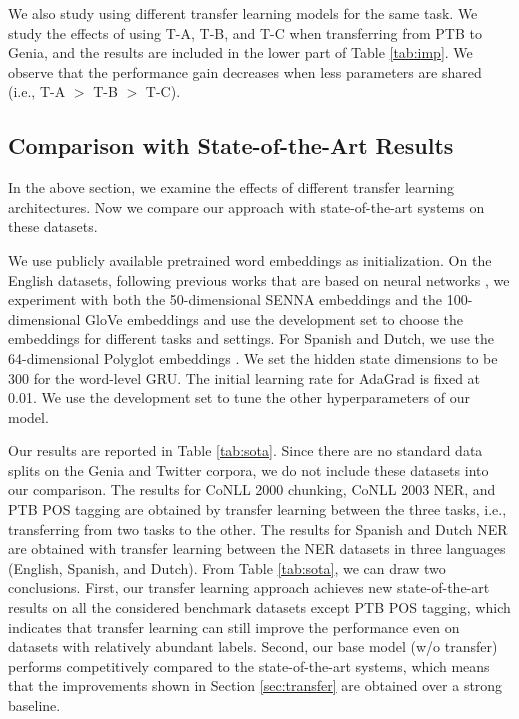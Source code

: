We also study using different transfer learning models for the same task. We study the effects of using T-A, T-B, and T-C when transferring from PTB to Genia, and the results are included in the lower part of Table \ref{tab:imp}. We observe that the performance gain decreases when less parameters are shared (i.e., T-A $>$ T-B $>$ T-C).

\subsection{Comparison with State-of-the-Art Results}

In the above section, we examine the effects of different transfer learning architectures. Now we compare our approach with state-of-the-art systems on these datasets.

We use publicly available pretrained word embeddings as initialization. On the English datasets, following previous works that are based on neural networks \citep{collobert2011natural,huang2015bidirectional,chiu2015named,ma2016end}, we experiment with both the 50-dimensional SENNA embeddings \citep{collobert2011natural} and the 100-dimensional GloVe embeddings \citep{pennington2014glove} and use the development set to choose the embeddings for different tasks and settings. For Spanish and Dutch, we use the 64-dimensional Polyglot embeddings \citep{al2013polyglot}. We set the hidden state dimensions to be 300 for the word-level GRU. The initial learning rate for AdaGrad is fixed at 0.01. We use the development set to tune the other hyperparameters of our model. 

Our results are reported in Table \ref{tab:sota}. Since there are no standard data splits on the Genia and Twitter corpora, we do not include these datasets into our comparison. The results for CoNLL 2000 chunking, CoNLL 2003 NER, and PTB POS tagging are obtained by transfer learning between the three tasks, i.e., transferring from two tasks to the other. The results for Spanish and Dutch NER are obtained with transfer learning between the NER datasets in three languages (English, Spanish, and Dutch).
From Table \ref{tab:sota}, we can draw two conclusions. First, our transfer learning approach achieves new state-of-the-art results on all the considered benchmark datasets except PTB POS tagging, which indicates that transfer learning can still improve the performance even on datasets with relatively abundant labels. Second, our base model (w/o transfer) performs competitively compared to the state-of-the-art systems, which means that the improvements shown in Section \ref{sec:transfer} are obtained over a strong baseline.



